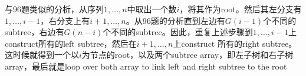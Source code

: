 与96题类似的分析，从序列$1,\ldots,n$中取出一个数$i$，将其作为root。然后其左分支有$1,\ldots,i-1$，右分支上有$i+1,\ldots,n$。从96题的分析直到左边有$G(i-1)$个不同的subtree，右边有$G(n-i)$个不同的subtree。因此，重复上述步骤到$1,\ldots, i-1$上construct所有的left subtree，然后在$i+1,\ldots,n$上construct 所有的right subtree。 这时候就得到一个以$i$为节点的root，以及两个subtree array，即左子树和右子树array，最后就是loop over both array to link left and right subtree to the root
%
